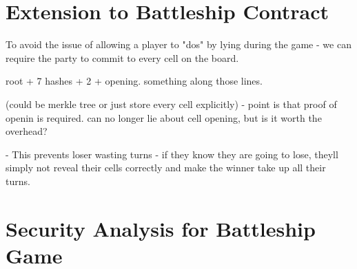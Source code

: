 \documentclass{llncs}
\begin{document}
\section{Extension to Battleship Contract}

To avoid the issue of allowing a player to "dos" by lying during the game - we can require the party to commit to every cell on the board. 

root + 7 hashes + 2 + opening. something along those lines. 

(could be merkle tree or just store every cell explicitly) - point is that proof of openin is required. can no longer lie about cell opening, but is it worth the overhead? 

- This prevents loser wasting turns - if they know they are going to lose, theyll simply not reveal their cells correctly and make the winner take up all their turns. 

\section{Security Analysis for Battleship Game}
\end{document}
